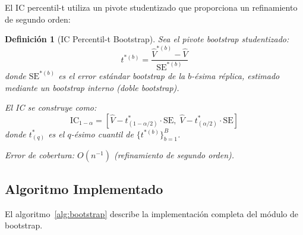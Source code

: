 \documentclass[12pt,a4paper]{article}
\newtheorem{definition}[theorem]{Definición}
\begin{document}
El IC percentil-t utiliza un pivote studentizado que proporciona un refinamiento de segundo orden:

\begin{definition}[IC Percentil-t Bootstrap]
	Sea el pivote bootstrap studentizado:
	\[
		t^{*(b)} = \frac{\hat{V}^{*(b)} - \hat{V}}{\text{SE}^{*(b)}}
	\]
	donde $\text{SE}^{*(b)}$ es el error estándar bootstrap de la $b$-ésima réplica, estimado mediante un bootstrap interno (doble bootstrap).

	El IC se construye como:
	\[
		\text{IC}_{1-\alpha} = \left[ \hat{V} - t^*_{(1-\alpha/2)} \cdot \text{SE},\; \hat{V} - t^*_{(\alpha/2)} \cdot \text{SE} \right]
	\]
	donde $t^*_{(q)}$ es el $q$-ésimo cuantil de $\{t^{*(b)}\}_{b=1}^B$.

	Error de cobertura: $O(n^{-1})$ (refinamiento de segundo orden).
\end{definition}

\subsection{Algoritmo Implementado}

El algoritmo~\ref{alg:bootstrap} describe la implementación completa del módulo de bootstrap.
\end{document}
